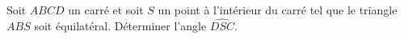 Soit $ABCD$ un carré et soit $S$ un point à l'intérieur du carré tel que le triangle $ABS$ soit équilatéral. Déterminer l'angle $\widehat{DSC}$.